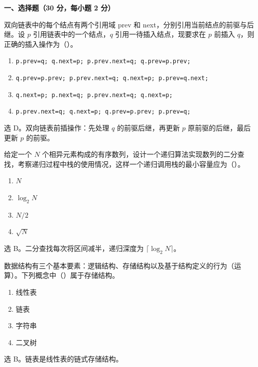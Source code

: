 
\textbf{一、选择题（30 分，每小题 2 分）}

\begin{question}
双向链表中的每个结点有两个引用域 prev 和 next，分别引用当前结点的前驱与后继。设 $p$ 引用链表中的一个结点，$q$ 引用一待插入结点，现要求在 $p$ 前插入 $q$，则正确的插入操作为（\quad）。
\begin{enumerate}
  \item \texttt{p.prev=q; q.next=p; p.prev.next=q; q.prev=p.prev;}
  \item \texttt{q.prev=p.prev; p.prev.next=q; q.next=p; p.prev=q.next;}
  \item \texttt{q.next=p; p.next=q; p.prev.next=q; q.next=p;}
  \item \texttt{p.prev.next=q; q.next=p; q.prev=p.prev; p.prev=q;}
\end{enumerate}
\begin{solution}
选 D。双向链表前插操作：先处理 $q$ 的前驱后继，再更新 $p$ 原前驱的后继，最后更新 $p$ 的前驱。
\end{solution}
\end{question}

\begin{question}
给定一个 $N$ 个相异元素构成的有序数列，设计一个递归算法实现数列的二分查找，考察递归过程中栈的使用情况，这样一个递归调用栈的最小容量应为（\quad）。
\begin{enumerate}
  \item $N$
  \item $\log_2 N$
  \item $N/2$
  \item $\sqrt{N}$
\end{enumerate}
\begin{solution}
选 B。二分查找每次将区间减半，递归深度为 $\lceil\log_2 N\rceil$。
\end{solution}
\end{question}

\begin{question}
数据结构有三个基本要素：逻辑结构、存储结构以及基于结构定义的行为（运算）。下列概念中（\quad）属于存储结构。
\begin{enumerate}
  \item 线性表
  \item 链表
  \item 字符串
  \item 二叉树
\end{enumerate}
\begin{solution}
选 B。链表是线性表的链式存储结构。
\end{solution}
\end{question}

